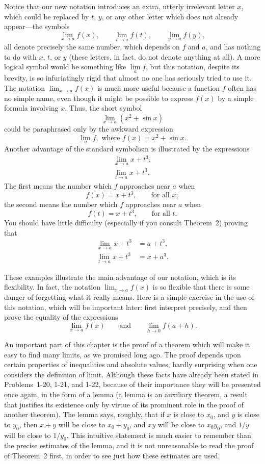 Notice that our new notation introduces an extra, utterly irrelevant letter
$x$, which could be replaced by $t$, $y$, or any other letter which does not
already appear---the symbols
\[
\lim_{x\to a}f(x),\qquad \lim_{t\to a}f(t),\qquad \lim_{y\to a}f(y),
\]
all denote precisely the same number, which depends on $f$ and $a$, and has
nothing to do with $x$, $t$, or $y$ (these letters, in fact, do not denote
anything at all). A more logical symbol would be something like
$\operatorname*{lim}\limits_{a}f$, but this notation, despite its brevity, is
so infuriatingly rigid that almost no one has seriously tried to use it. The
notation $\lim_{x\to a}f(x)$ is much more useful because a function $f$ often
has no simple name, even though it might be possible to express $f(x)$ by a
simple formula involving $x$. Thus, the short symbol
\[
\lim_{x\to a}(x^2+\sin x)
\]
could be paraphrased only by the awkward expression
\[
\operatorname*{lim}\limits_{a}f,\text{ where }f(x)=x^2+\sin x.
\]
Another advantage of the standard symbolism is illustrated by the expressions
\begin{align*}
\lim_{x\to a}x+t^3,\\
\lim_{t\to a}x+t^3.
\end{align*}
The first means the number which $f$ approaches near $a$ when
\[
f(x)=x+t^3, \qquad\text{for all }x;
\]
the second means the number which $f$ approaches near $a$ when
\[
f(t)=x+t^3, \qquad\text{for all }t.
\]
You should have little difficulty (especially if you consult Theorem~2)
proving that
\begin{align*}
\lim_{x\to a}x+t^3&=a+t^3,\\
\lim_{t\to a}x+t^3&=x+a^3.
\end{align*}

These examples illustrate the main advantage of our notation, which is its
flexibility. In fact, the notation $\lim_{x\to a}f(x)$ is so flexible that
there is some danger of forgetting what it really means. Here is a simple
exercise in the use of this notation, which will be important later: first
interpret precisely, and then prove the equality of the expressions
\[
\lim_{x\to a}f(x) \qquad\text{and}\qquad \lim_{h\to 0}f(a+h).
\]

An important part of this chapter is the proof of a theorem which will make it
easy to find many limits, as we promised long ago. The proof depends upon
certain properties of inequalities and absolute values, hardly surprising when
one considers the definition of limit. Although these facts have already been
stated in Problems~1-20, 1-21, and 1-22, because of their importance they will
be presented once again, in the form of a lemma (a lemma is an auxiliary
theorem, a result that justifies its existence only by virtue of its prominent
role in the proof of another theorem). The lemma says, roughly, that if $x$ is
close to $x_0$, and $y$ is close to $y_0$, then $x+y$ will be close to
$x_0+y_0$, and $xy$ will be close to $x_0 y_0$, and $1/y$ will be close to
$1/y_0$. This intuitive statement is much easier to remember than the precise
estimates of the lemma, and it is not unreasonable to read the proof of
Theorem~2 first, in order to see just how these estimates are used.

